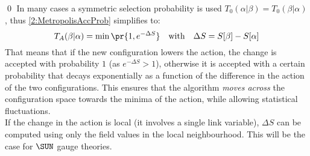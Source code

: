 \qed
In many cases a symmetric selection probability is used $T_0(\alpha|\beta)=T_0(\beta|\alpha)$, thus \eqref{2:MetropolisAccProb} simplifies to:
\begin{equation}
    T_A(\beta|\alpha) = \min\pr{1, e^{-\Delta S}} \quad \text{with} \quad \Delta S = S[\beta]-S[\alpha] \label{2:MetropolisAccProbSymm}
\end{equation}
That means that if the new configuration lowers the action, the change is accepted with probability $1$ (as $e^{-\Delta S}>1$), otherwise it is accepted with a certain probability that decays exponentially as a function of the difference in the action of the two configurations.
This ensures that the algorithm \emph{moves across} the configuration space towards the minima of the action, while allowing statistical fluctuations.\\
If the change in the action is local (it involves a single link variable), $\Delta S$ can be computed using only the field values in the local neighbourhood. This will be the case for $\SUN$ gauge theories.

